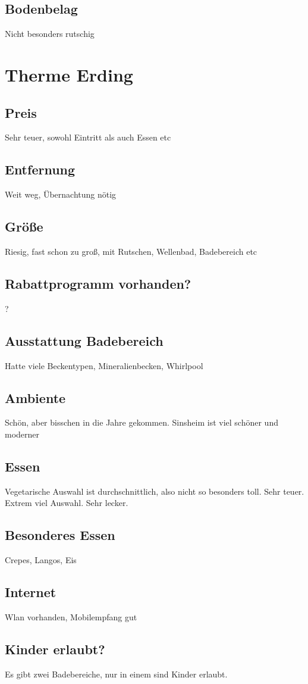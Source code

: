 \documentclass{article}
\begin{document}
\subsection*{Bodenbelag} Nicht besonders rutschig

\section*{Therme Erding}
\subsection*{Preis} Sehr teuer, sowohl Eintritt als auch Essen etc
\subsection*{Entfernung} Weit weg, Übernachtung nötig
\subsection*{Größe} Riesig, fast schon zu groß, mit Rutschen, Wellenbad, Badebereich etc
\subsection*{Rabattprogramm vorhanden?} ?
\subsection*{Ausstattung Badebereich} Hatte viele Beckentypen, Mineralienbecken, Whirlpool
\subsection*{Ambiente} Schön, aber bisschen in die Jahre gekommen. Sinsheim ist viel schöner und moderner
\subsection*{Essen} Vegetarische Auswahl ist durchschnittlich, also nicht so besonders toll. Sehr teuer. Extrem viel Auswahl. Sehr lecker.
\subsection*{Besonderes Essen} Crepes, Langos, Eis
\subsection*{Internet} Wlan vorhanden, Mobilempfang gut
\subsection*{Kinder erlaubt?} Es gibt zwei Badebereiche, nur in einem sind Kinder erlaubt.
\end{document}
